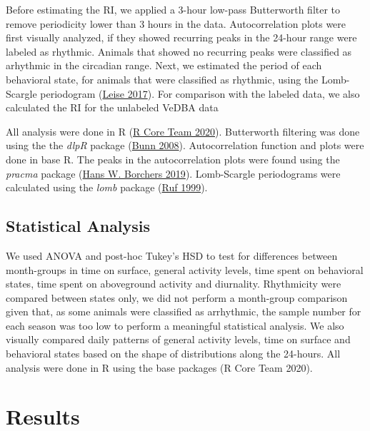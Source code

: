 \documentclass[english,msc,numbers,hidelinks]{coppe}
\begin{document}
  Before estimating the RI, we applied a 3-hour low-pass Butterworth filter to remove periodicity lower than 3 hours in the data. Autocorrelation plots were first visually analyzed, if they showed recurring peaks in the 24-hour range were labeled as rhythmic. Animals that showed no recurring peaks were classified as arhythmic in the circadian range. Next, we estimated the period of each behavioral state, for animals that were classified as rhythmic, using the Lomb-Scargle periodogram (\protect\hyperlink{ref-leise2017}{Leise 2017}). For comparison with the labeled data, we also calculated the RI for the unlabeled VeDBA data

  All analysis were done in R (\protect\hyperlink{ref-rcoreteam2020}{R Core Team 2020}). Butterworth filtering was done using the the \emph{dlpR} package (\protect\hyperlink{ref-bunn2008}{Bunn 2008}). Autocorrelation function and plots were done in base R. The peaks in the autocorrelation plots were found using the \emph{pracma} package (\protect\hyperlink{ref-hansw.borchers2019}{Hans W. Borchers 2019}). Lomb-Scargle periodograms were calculated using the \emph{lomb} package (\protect\hyperlink{ref-ruf1999}{Ruf 1999}).

  \hypertarget{statistical-analysis}{%
  \subsection{Statistical Analysis}\label{statistical-analysis}}

  We used ANOVA and post-hoc Tukey's HSD to test for differences between month-groups in time on surface, general activity levels, time spent on behavioral states, time spent on aboveground activity and diurnality. Rhythmicity were compared between states only, we did not perform a month-group comparison given that, as some animals were classified as arrhythmic, the sample number for each season was too low to perform a meaningful statistical analysis. We also visually compared daily patterns of general activity levels, time on surface and behavioral states based on the shape of distributions along the 24-hours. All analysis were done in R using the base packages (R Core Team 2020).

  \newpage

  \hypertarget{results}{%
  \section{Results}\label{results}}
\end{document}
